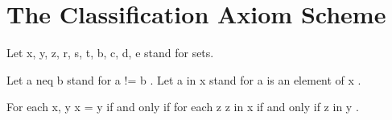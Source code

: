 \documentclass[a4paper,draft]{amsproc}
\begin{document}
\section{The Classification Axiom Scheme}
\begin{forthel}

Let  x, y, z, r, s, t, b, c, d, e  stand for sets.

Let  a neq b  stand for  a  !=  b .
Let  a in x  stand for  a  is an element of  x .


\begin{axiom}
For each  x, y   x = y  if and only if for each  z   z in x  if and only if  z in y .
\end{axiom}



\end{forthel}
\end{document}
